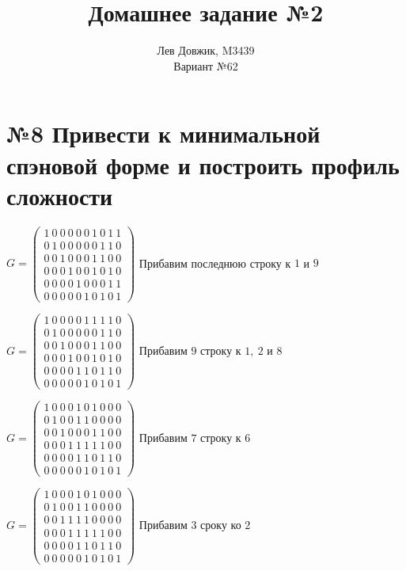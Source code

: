 \documentclass[fontsize=14pt]{article}
\title{Домашнее задание №2}
\author{Лев Довжик, M3439 \\ Вариант №62}
\date{}
\begin{document}
	\maketitle
	
\section*{№8 Привести к минимальной спэновой форме и построить профиль сложности}

$G = 
\begin{pmatrix}
	1\ 0\ 0\ 0\ 0\ 0\ 1\ 0\ 1\ 1\\
	0\ 1\ 0\ 0\ 0\ 0\ 0\ 1\ 1\ 0\\
	0\ 0\ 1\ 0\ 0\ 0\ 1\ 1\ 0\ 0\\
	0\ 0\ 0\ 1\ 0\ 0\ 1\ 0\ 1\ 0\\
	0\ 0\ 0\ 0\ 1\ 0\ 0\ 0\ 1\ 1\\
	0\ 0\ 0\ 0\ 0\ 1\ 0\ 1\ 0\ 1	
\end{pmatrix}$
Прибавим последнюю строку к $1$ и $9$

\bigskip
\noindent
$G = 
\begin{pmatrix}
	1\ 0\ 0\ 0\ 0\ 1\ 1\ 1\ 1\ 0\\
	0\ 1\ 0\ 0\ 0\ 0\ 0\ 1\ 1\ 0\\
	0\ 0\ 1\ 0\ 0\ 0\ 1\ 1\ 0\ 0\\
	0\ 0\ 0\ 1\ 0\ 0\ 1\ 0\ 1\ 0\\
	0\ 0\ 0\ 0\ 1\ 1\ 0\ 1\ 1\ 0\\
	0\ 0\ 0\ 0\ 0\ 1\ 0\ 1\ 0\ 1	
\end{pmatrix}$
Прибавим $9$ строку к $1,\ 2$ и $8$

\bigskip
\noindent
$G = 
\begin{pmatrix}
	1\ 0\ 0\ 0\ 1\ 0\ 1\ 0\ 0\ 0\\
	0\ 1\ 0\ 0\ 1\ 1\ 0\ 0\ 0\ 0\\
	0\ 0\ 1\ 0\ 0\ 0\ 1\ 1\ 0\ 0\\
	0\ 0\ 0\ 1\ 1\ 1\ 1\ 1\ 0\ 0\\
	0\ 0\ 0\ 0\ 1\ 1\ 0\ 1\ 1\ 0\\
	0\ 0\ 0\ 0\ 0\ 1\ 0\ 1\ 0\ 1	
\end{pmatrix}$
Прибавим $7$ строку к $6$

\bigskip
\noindent
$G = 
\begin{pmatrix}
	1\ 0\ 0\ 0\ 1\ 0\ 1\ 0\ 0\ 0\\
	0\ 1\ 0\ 0\ 1\ 1\ 0\ 0\ 0\ 0\\
	0\ 0\ 1\ 1\ 1\ 1\ 0\ 0\ 0\ 0\\
	0\ 0\ 0\ 1\ 1\ 1\ 1\ 1\ 0\ 0\\
	0\ 0\ 0\ 0\ 1\ 1\ 0\ 1\ 1\ 0\\
	0\ 0\ 0\ 0\ 0\ 1\ 0\ 1\ 0\ 1	
\end{pmatrix}$
Прибавим $3$ сроку ко $2$
\end{document}
